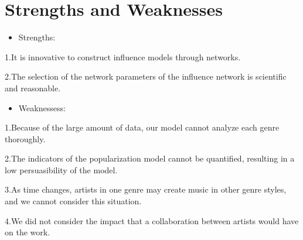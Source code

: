 \documentclass[12pt]{article}  %
\begin{document}
\section{Strengths and Weaknesses}
\begin{itemize}
\item Strengths:
\end{itemize}

1.It is innovative to construct influence models through networks.

2.The selection of the network parameters of the influence network is scientific and reasonable.

\begin{itemize}
\item Weaknessess:
\end{itemize}

1.Because of the large amount of data, our model cannot analyze each genre thoroughly.

2.The indicators of the popularization model cannot be quantified, resulting in a low persuasibility of the model.

3.As time changes, artists in one genre may create music in other genre styles, and we cannot consider this situation.

4.We did not consider the impact that a collaboration between artists would have on the work.
\newpage
\end{document}
